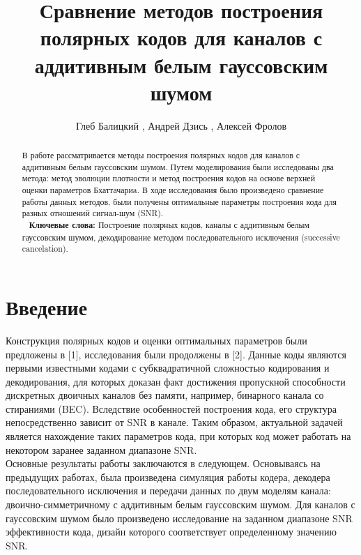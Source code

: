 \documentclass{llncs}
\begin{document}
\title{Сравнение методов построения полярных кодов для каналов с аддитивным белым гауссовским шумом}


\author{Глеб Балицкий , Андрей Дзись , Алексей Фролов  }




\maketitle          
\begin{abstract} В работе рассматривается методы построения полярных кодов для каналов с аддитивным белым гауссовским шумом. Путем моделирования были исследованы два метода: метод эволюции плотности и метод построения кодов на основе верхней оценки параметров Бхаттачариa. В ходе исследования было произведено сравнение работы данных методов, были получены оптимальные параметры построения кода для разных отношений сигнал-шум (SNR). 
\\

\
\textbf{Ключевые слова:} Построение  полярных кодов, каналы с аддитивным белым гауссовским шумом, декодирование методом последовательного исключения (successive cancelation).
\end{abstract}

\section{Введение}
Конструкция полярных кодов и оценки оптимальных параметров были предложены в [1], исследования были продолжены в [2]. Данные коды являются первыми известными кодами с субквадратичной сложностью кодирования и декодирования, для которых доказан факт достижения пропускной способности дискретных двоичных каналов без памяти, например, бинарного канала со стираниями (BEC). Вследствие особенностей построения кода, его структура непосредственно зависит от SNR в канале. Таким образом, актуальной задачей является нахождение таких параметров кода, при которых код может работать на некотором заранее заданном диапазоне SNR.
\\
Основные результаты работы заключаются в следующем. Основываясь на предыдущих работах,  была произведена симуляция работы кодера, декодера последовательного исключения  и передачи данных по двум моделям канала: двоично-симметричному с аддитивным белым гауссовским шумом. Для каналов с гауссовским шумом было произведено исследование  на заданном диапазоне SNR эффективности кода, дизайн которого соответствует определенному значению SNR. 
\end{document}
